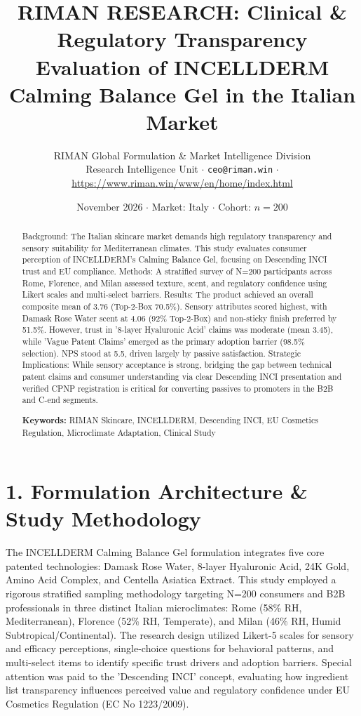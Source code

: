 \documentclass[10pt,twocolumn,a4paper]{article}
\title{\textbf{RIMAN RESEARCH: Clinical \& Regulatory Transparency Evaluation of INCELLDERM Calming Balance Gel in the Italian Market}}
\author{RIMAN Global Formulation \& Market Intelligence Division\\
\small Research Intelligence Unit $\cdot$ \texttt{ceo@riman.win} $\cdot$ \url{https://www.riman.win/www/en/home/index.html}}
\date{November 2026 \quad $\cdot$ \quad Market: Italy \quad $\cdot$ \quad Cohort: $n = 200$}
\begin{document}
\maketitle

\begin{abstract}
Background: The Italian skincare market demands high regulatory transparency and sensory suitability for Mediterranean climates. This study evaluates consumer perception of INCELLDERM's Calming Balance Gel, focusing on Descending INCI trust and EU compliance. Methods: A stratified survey of N=200 participants across Rome, Florence, and Milan assessed texture, scent, and regulatory confidence using Likert scales and multi-select barriers. Results: The product achieved an overall composite mean of 3.76 (Top-2-Box 70.5\%). Sensory attributes scored highest, with Damask Rose Water scent at 4.06 (92\% Top-2-Box) and non-sticky finish preferred by 51.5\%. However, trust in '8-layer Hyaluronic Acid' claims was moderate (mean 3.45), while 'Vague Patent Claims' emerged as the primary adoption barrier (98.5\% selection). NPS stood at 5.5, driven largely by passive satisfaction. Strategic Implications: While sensory acceptance is strong, bridging the gap between technical patent claims and consumer understanding via clear Descending INCI presentation and verified CPNP registration is critical for converting passives to promoters in the B2B and C-end segments.

\vspace{0.4em}
\noindent\textbf{Keywords:} RIMAN Skincare, INCELLDERM, Descending INCI, EU Cosmetics Regulation, Microclimate Adaptation, Clinical Study
\end{abstract}

\section{1. Formulation Architecture \& Study Methodology}
The INCELLDERM Calming Balance Gel formulation integrates five core patented technologies: Damask Rose Water, 8-layer Hyaluronic Acid, 24K Gold, Amino Acid Complex, and Centella Asiatica Extract. This study employed a rigorous stratified sampling methodology targeting N=200 consumers and B2B professionals in three distinct Italian microclimates: Rome (58\% RH, Mediterranean), Florence (52\% RH, Temperate), and Milan (46\% RH, Humid Subtropical/Continental). The research design utilized Likert-5 scales for sensory and efficacy perceptions, single-choice questions for behavioral patterns, and multi-select items to identify specific trust drivers and adoption barriers. Special attention was paid to the 'Descending INCI' concept, evaluating how ingredient list transparency influences perceived value and regulatory confidence under EU Cosmetics Regulation (EC No 1223/2009).
\end{document}

